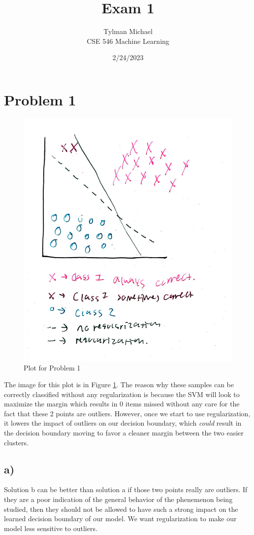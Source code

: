 \documentclass[12pt]{article}
\title{Exam 1}
\author{Tylman Michael\\CSE 546 Machine Learning}
\date{2/24/2023}
\begin{document}
\maketitle{}
\section{Problem 1}
\begin{figure}
\includegraphics[width=.65\textwidth]{../results/Prob_1_plot.PNG}
\caption{Plot for Problem 1}
\label{image1}
\end{figure}
The image for this plot is in Figure  \ref{image1}. The reason why these samples can be correctly classified without any 
regularization is because the SVM will look to maximize the margin which results in 0 items missed without any care for
the fact that these 2 points are outliers. However, once we start to use regularization, it lowers the impact of outliers
on our decision boundary, which \emph{could} result in the decision boundary moving to favor a cleaner margin between 
the two easier clusters.
\subsection{a)}
Solution b can be better than solution a if those two points really are outliers. If they are a poor indication of the 
general behavior of the phenemenon being studied, then they should not be allowed to have such a strong impact on the 
learned decision boundary of our model. We want regularization to make our model less sensitive to outliers.
\end{document}
